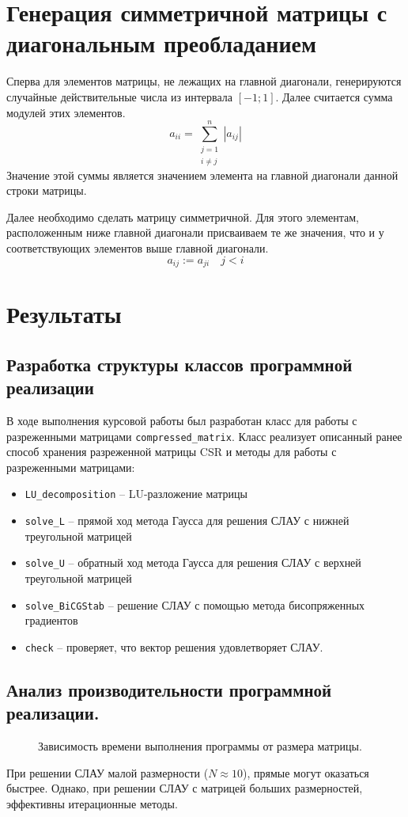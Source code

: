 \documentclass[a4paper, fontsize=14pt]{article}
\begin{document}
\section{Генерация симметричной матрицы с диагональным преобладанием}
Сперва для элементов матрицы, не лежащих на главной диагонали, генерируются случайные действительные
числа из интервала $[-1;1]$. Далее считается сумма модулей этих элементов. 
$$
    a_{ii} = \sum^{n}_{\substack{j=1\\ i \neq j}} |a_{ij}| 
$$
Значение этой суммы является значением элемента на главной диагонали данной строки матрицы. 

Далее необходимо сделать матрицу симметричной. Для этого элементам, расположенным ниже главной
диагонали присваиваем те же значения, что и у соответствующих элементов выше главной диагонали.
$$
    a_{ij} := a_{ji} \quad j<i
$$
\section{Результаты}
\subsection{Разработка структуры классов программной реализации}
В ходе выполнения курсовой работы был разработан класс для работы 
с разреженными матрицами \verb|compressed_matrix|. Класс реализует описанный ранее способ хранения разреженной матрицы CSR и
методы для работы с разреженными матрицами:
\begin{itemize}
    \item \verb|LU_decomposition| -- LU-разложение матрицы 
    \item \verb|solve_L| -- прямой ход метода Гаусса для решения СЛАУ с нижней треугольной матрицей
    \item \verb|solve_U| -- обратный ход метода Гаусса для решения СЛАУ с верхней треугольной
        матрицей
    \item \verb|solve_BiCGStab| -- решение СЛАУ с помощью метода бисопряженных градиентов 
    \item \verb|check| -- проверяет, что вектор решения удовлетворяет СЛАУ.

\end{itemize}


\subsection{Анализ производительности программной реализации.}
\begin{figure}[h]
    \scriptsize
    \centering
    
    \caption{Зависимость времени выполнения программы от размера матрицы.}
    \label{fig:comp}
\end{figure}
При решении СЛАУ малой размерности ($N \approx 10$), прямые могут оказаться быстрее.
Однако, при решении СЛАУ с матрицей больших размерностей, эффективны итерационные методы. 
\end{document}

